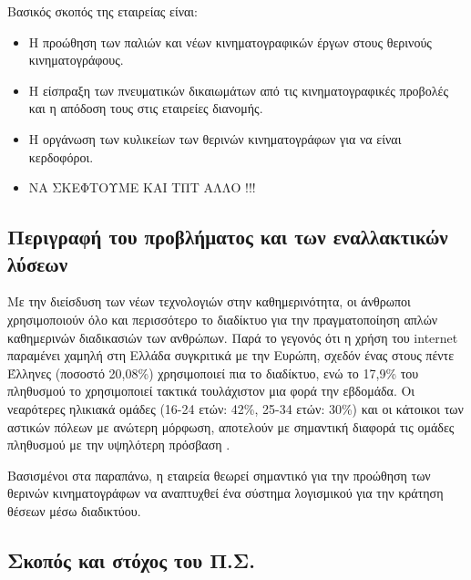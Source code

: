 \documentclass{assignment}
\begin{document}
Βασικός σκοπός της εταιρείας είναι:

\begin{itemize}
\item Η προώθηση των παλιών και νέων κινηματογραφικών έργων στους θερινούς κινηματογράφους. 
\item Η είσπραξη των πνευματικών δικαιωμάτων από τις κινηματογραφικές προβολές και η απόδοση τους στις εταιρείες διανομής.
\item Η οργάνωση των κυλικείων των θερινών κινηματογράφων για να είναι κερδοφόροι.
\item ΝΑ ΣΚΕΦΤΟΥΜΕ ΚΑΙ ΤΠΤ ΑΛΛΟ !!!
\end{itemize}


\subsection{Περιγραφή του προβλήματος και των εναλλακτικών λύσεων}


Με την διείσδυση των νέων τεχνολογιών στην καθημερινότητα, οι άνθρωποι χρησιμοποιούν όλο και περισσότερο το διαδίκτυο για την πραγματοποίηση απλών καθημερινών διαδικασιών των ανθρώπων. Παρά το γεγονός ότι η χρήση του internet παραμένει χαμηλή στη Ελλάδα συγκριτικά με την Ευρώπη, σχεδόν ένας στους πέντε Έλληνες (ποσοστό 20,08\%) χρησιμοποιεί πια το διαδίκτυο, ενώ το 17,9\% του πληθυσμού το χρησιμοποιεί τακτικά τουλάχιστον μια φορά την εβδομάδα. Οι νεαρότερες ηλικιακά ομάδες (16-24 ετών: 42\%, 25-34 ετών: 30\%) και οι κάτοικοι των αστικών πόλεων με ανώτερη μόρφωση, αποτελούν με σημαντική διαφορά τις ομάδες πληθυσμού με την υψηλότερη πρόσβαση \cite{infosoc}. 

Βασισμένοι στα παραπάνω, η εταιρεία θεωρεί σημαντικό για την προώθηση των θερινών κινηματογράφων να αναπτυχθεί ένα σύστημα λογισμικού για την κράτηση θέσεων μέσω διαδικτύου.

\subsection{Σκοπός και στόχος του Π.Σ.}
\end{document}
